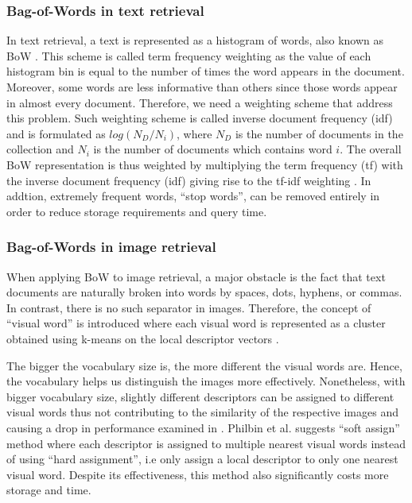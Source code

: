 \subsubsection{Bag-of-Words in text retrieval}\label{section:bow_text}
In text retrieval, a text is represented as a histogram of words, also known as BoW \cite{4}. This scheme is called term frequency weighting as the value of each histogram bin is equal to the number of times the word appears in the document.
Moreover, some words are less informative than others since those words appear in almost every document. Therefore, we need a weighting scheme that address this problem. Such weighting scheme is called inverse document frequency (idf) and is formulated as $log(N_{D} / N_{i})$, where $N_{D}$ is the number of documents in the collection and $N_{i}$ is the number of documents which contains word $i$. The overall BoW representation is thus weighted by multiplying the term frequency (tf) with the inverse document frequency (idf) giving rise to the tf-idf weighting \cite{4}. In addtion, extremely frequent words, ``stop words'', can be removed entirely in order to reduce storage requirements and query time.


\subsubsection{Bag-of-Words in image retrieval} \label{section:bow_image}

When applying BoW to image retrieval, a major obstacle is the fact that text documents are naturally broken into words by spaces, dots, hyphens, or commas. In contrast, there is no such separator in images. Therefore, the concept of ``visual word'' is introduced where each visual word is represented as a cluster obtained using k-means on the local descriptor vectors \cite{3}.

The bigger the vocabulary size is, the more different the visual words are. Hence, the vocabulary helps us distinguish the images more effectively. Nonetheless, with bigger vocabulary size, slightly different descriptors can be assigned to different visual words thus not contributing to the similarity of the respective images and causing a drop in performance examined in \cite{5, 6, 7}. Philbin et al. \cite{7} suggests ``soft assign'' method where each descriptor is assigned to multiple nearest visual words instead of using ``hard assignment'', i.e only assign a local descriptor to only one nearest visual word. Despite its effectiveness, this method also significantly costs more storage and time.



